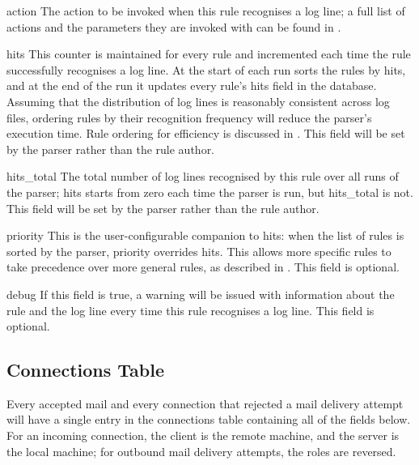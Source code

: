 \begin{boldeqlist}
    \item [action] The action to be invoked when this rule recognises a log
        line; a full list of actions and the parameters they are invoked
        with can be found in .

    \item [hits] This counter is maintained for every rule and incremented
        each time the rule successfully recognises a log line.  At the
        start of each run \parsername{} sorts the rules by hits, and at the
        end of the run it updates every rule's hits field in the database.
        Assuming that the distribution of log lines is reasonably
        consistent across log files, ordering rules by their recognition
        frequency will reduce the parser's execution time.  Rule ordering
        for efficiency is discussed in .  This field will be set by the parser rather than the
        rule author.

    \item [hits\_total] The total number of log lines recognised by this
        rule over all runs of the parser; hits starts from zero each time
        the parser is run, but hits\_total is not.  This field will be set
        by the parser rather than the rule author.

    \item [priority] This is the user-configurable companion to hits: when
        the list of rules is sorted by the parser, priority overrides hits.
        This allows more specific rules to take precedence over more
        general rules, as described in .
        This field is optional.

    \item [debug] If this field is true, a warning will be issued with
        information about the rule and the log line every time this rule
        recognises a log line.  This field is optional.

\end{boldeqlist}

\subsection{Connections Table}

\label{connections table}

Every accepted mail and every connection that rejected a mail delivery
attempt will have a single entry in the connections table containing all of
the fields below.  For an incoming connection, the client is the remote
machine, and the server is the local machine; for outbound mail delivery
attempts, the roles are reversed.

